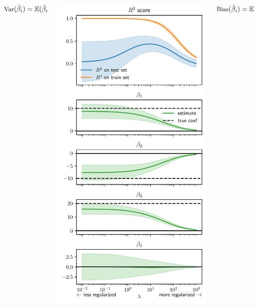 \documentclass[presentation,mathserif,table]{beamer}
\begin{document}
\begin{frame}[label={sec:org02d6cdd}]{}
\begin{columns}
\begin{column}{.33\columnwidth}
\(\small{ \text{Var}(\hat{\beta}_i) = \mathbb{E}(\hat{\beta}_i  - \mathbb{E}(\hat{\beta}_i))^2}\)
\end{column}

\begin{column}{.38\columnwidth}
\begin{center}
\includegraphics[height=\textheight]{ridge_regularization_path.pdf}
\end{center}
\end{column}
\begin{column}{.3\columnwidth}
\(\small \text{Bias}(\hat{\beta}_i) = \mathbb{E}(\hat{\beta}_i) - \beta_i\)
\end{column}
\end{columns}
\end{frame}
\end{document}

